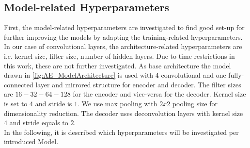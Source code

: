 \documentclass[12pt,DIV14,BCOR12mm,a4paper,footexclude,headinclude,halfparskip-,twoside,openright,openany,cleardoubleempty,idxtotoc,bibtotoc]{scrreprt} %
\numberwithin{equation}{chapter}
\begin{document}
\subsection{Model-related Hyperparameters}\label{subsec:Model-related Hyperparameters}
First, the model-related hyperparameters are investigated to find good set-up for further improving the models by adapting the training-related hyperparameters. In our case of convolutional layers, the architecture-related hyperparameters are i.e. kernel size, filter size, number of hidden layers. Due to time restrictions in this work, these are not further investigated. As base architecture the model drawn in \ref{fig:AE_ModelArchitecture} is used with 4 convolutional and one fully-connected layer and mirrored structure for encoder and decoder. The filter sizes are $16-32-64-128$ for the encoder and vice-versa for the decoder. Kernel size is set to $4$ and stride is $1$. We use max pooling with $2x2$ pooling size for dimensionality reduction. The decoder uses deconvolution layers with kernel size $4$ and stride equals to $2$.\\
In the following, it is described which hyperparameters will be investigated per introduced Model.
\end{document}
